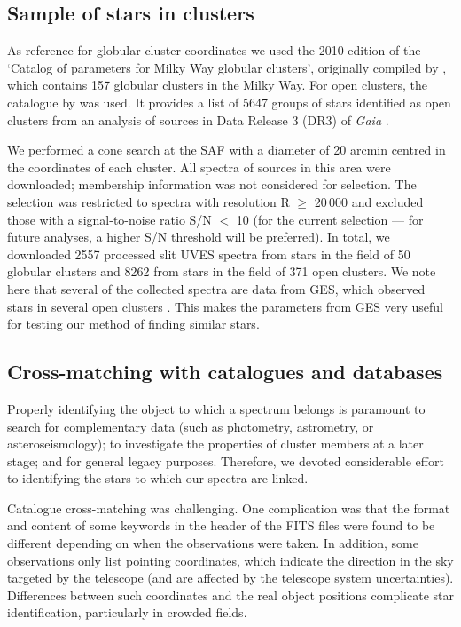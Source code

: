 \documentclass{aa}
\begin{document}
\subsection{Sample of stars in clusters}
\label{subsec:sample_clusters}

As reference for globular cluster coordinates we used the 2010 edition of the `Catalog of parameters for Milky Way globular clusters', originally compiled by \cite{Harris96}, which contains 157 globular clusters in the Milky Way. For open clusters, the catalogue by \cite{2023A&A...673A.114H, 2024A&A...686A..42H} was used. It provides a list of 5647 groups of stars identified as open clusters from an analysis of sources in Data Release 3 (DR3) of \textit{Gaia} \citep{GaiaDR3}.

We performed a cone search at the SAF with a diameter of 20 arcmin centred in the coordinates of each cluster. All spectra of sources in this area were downloaded; membership information was not considered for selection. The selection was restricted to spectra with resolution R $\geq$ 20\,000 and excluded those with a signal-to-noise ratio S/N $<$ 10 (for the current selection --- for future analyses, a higher S/N threshold will be preferred). In total, we downloaded 2557 processed slit UVES spectra from stars in the field of 50 globular clusters and 8262 from stars in the field of 371 open clusters. We note here that several of the collected spectra are data from GES, which observed stars in several open clusters \citep{Bragaglia2022}. This makes the parameters from GES very useful for testing our method of finding similar stars.

\subsection{Cross-matching with catalogues and databases}
\label{subsec:crossmatch}

Properly identifying the object to which a spectrum belongs is paramount to search for complementary data (such as photometry, astrometry, or asteroseismology); to investigate the properties of cluster members at a later stage; and for general legacy purposes. Therefore, we devoted considerable effort to identifying the stars to which our spectra are linked.

Catalogue cross-matching was challenging. One complication was that the format and content of some keywords in the header of the FITS files were found to be different depending on when the observations were taken. In addition, some observations only list pointing coordinates, which indicate the direction in the sky targeted by the telescope (and are affected by the telescope system uncertainties). Differences between such coordinates and the real object positions complicate star identification, particularly in crowded fields. 
\end{document}
